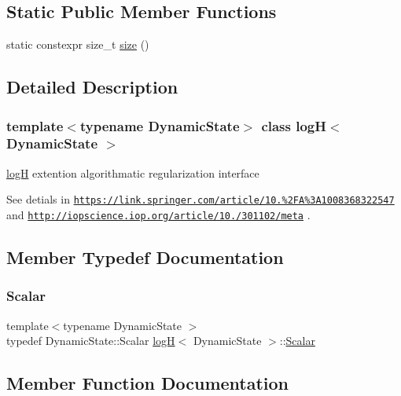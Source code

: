 \subsection*{Static Public Member Functions}
\begin{DoxyCompactItemize}
\item 
static constexpr size\+\_\+t \mbox{\hyperlink{classlog_h_a94f9577ea2cc32d422ebf078e123480b}{size}} ()
\end{DoxyCompactItemize}


\subsection{Detailed Description}
\subsubsection*{template$<$typename Dynamic\+State$>$\newline
class log\+H$<$ Dynamic\+State $>$}

\mbox{\hyperlink{classlog_h}{logH}} extention algorithmatic regularization interface 

See detials in \href{https://link.springer.com/article/10.1023%2FA%3A1008368322547}{\tt https\+://link.\+springer.\+com/article/10.\+1023\%2\+F\+A\%3\+A1008368322547} and \href{http://iopscience.iop.org/article/10.1086/301102/meta}{\tt http\+://iopscience.\+iop.\+org/article/10.\+1086/301102/meta} . 

\subsection{Member Typedef Documentation}
\mbox{\label{classlog_h_a3c5a69c2908971aa6cd8ff82845418d0}} 
\subsubsection{\texorpdfstring{Scalar}{Scalar}}
{\footnotesize\ttfamily template$<$typename Dynamic\+State $>$ \\
typedef Dynamic\+State\+::\+Scalar \mbox{\hyperlink{classlog_h}{logH}}$<$ Dynamic\+State $>$\+::\mbox{\hyperlink{classlog_h_a3c5a69c2908971aa6cd8ff82845418d0}{Scalar}}}



\subsection{Member Function Documentation}
\mbox{\label{classlog_h_a57fa85fad38dae198ec4eadd757d4f40}} 
